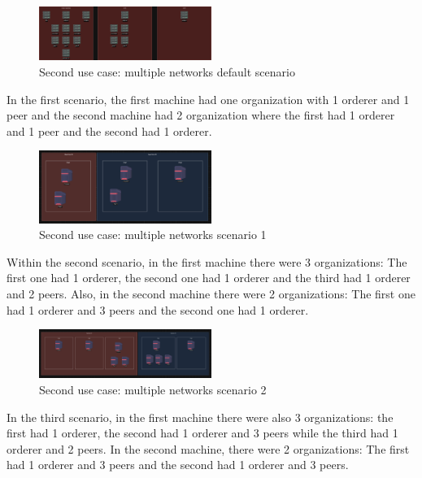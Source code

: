 \begin{figure}[H]
    \centering
    \includegraphics[width=0.5\textwidth]{assets/use-case-2/default-first-netwrk.drawio.png} %
    \caption{Second use case: multiple networks default scenario}
    \label{fig:sample-image} 
\end{figure}

In the first scenario, the first machine had one organization with 1 orderer and 1 peer and the second machine had 2 organization where the first had 1 orderer and 1 peer and the second had 1 orderer.

\begin{figure}[H]
    \centering
    \includegraphics[width=0.5\textwidth]{assets/use-case-2/scenario1.png} %
    \caption{Second use case: multiple networks scenario 1}
    \label{fig:sample-image} 
\end{figure}

Within the second scenario, in the first machine there were 3 organizations: The first one had 1 orderer, the second one had 1 orderer and the third had 1 orderer and 2 peers. Also, in the second machine there were 2 organizations: The first one had 1 orderer and 3 peers and the second one had 1 orderer.

\begin{figure}[H]
    \centering
    \includegraphics[width=0.5\textwidth]{assets/use-case-2/scenario2.png} %
    \caption{Second use case: multiple networks scenario 2}
    \label{fig:sample-image} 
\end{figure}

In the third scenario, in the first machine there were also 3 organizations: the first had 1 orderer, the second had 1 orderer and 3 peers while the third had 1 orderer and 2 peers. In the second machine, there were 2 organizations: The first had 1 orderer and 3 peers and the second had 1 orderer and 3 peers.


